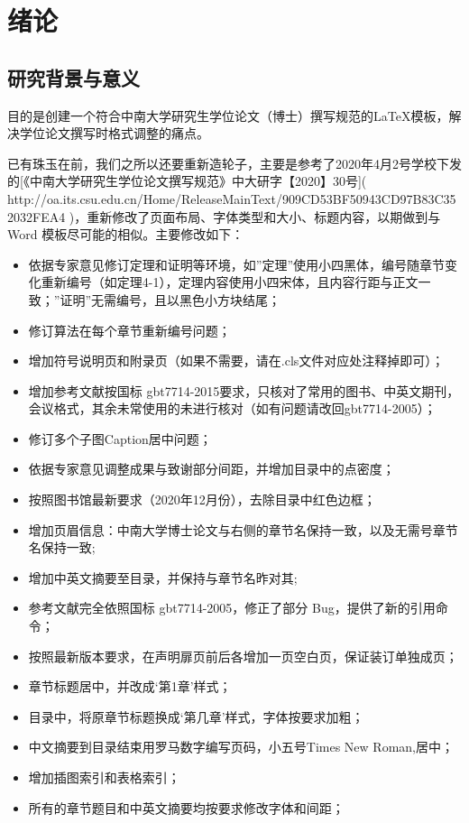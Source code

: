 \section{绪论}
\subsection{研究背景与意义}

目的是创建一个符合中南大学研究生学位论文（博士）撰写规范的LaTeX模板，解决学位论文撰写时格式调整的痛点。

已有珠玉在前，我们之所以还要重新造轮子，主要是参考了2020年4月2号学校下发的[《中南大学研究生学位论文撰写规范》中大研字【2020】30号]( http://oa.its.csu.edu.cn/Home/ReleaseMainText/909CD53BF50943CD97B83C352032FEA4 )，重新修改了页面布局、字体类型和大小、标题内容，以期做到与 Word 模板尽可能的相似。主要修改如下：
\begin{itemize}
\item 依据专家意见修订定理和证明等环境，如”定理”使用小四黑体，编号随章节变化重新编号（如定理4-1），定理内容使用小四宋体，且内容行距与正文一致；”证明”无需编号，且以黑色小方块结尾；
\item 修订算法在每个章节重新编号问题；
\item 增加符号说明页和附录页（如果不需要，请在.cls文件对应处注释掉即可）；
\item  增加参考文献按国标 gbt7714-2015要求，只核对了常用的图书、中英文期刊，会议格式，其余未常使用的未进行核对（如有问题请改回gbt7714-2005）；
\item  修订多个子图Caption居中问题；
\item 依据专家意见调整成果与致谢部分间距，并增加目录中的点密度；
\item 按照图书馆最新要求（2020年12月份），去除目录中红色边框；
\item 增加页眉信息：中南大学博士论文与右侧的章节名保持一致，以及无需号章节名保持一致;
\item 增加中英文摘要至目录，并保持与章节名昨对其;
\item 参考文献完全依照国标 gbt7714-2005，修正了部分 Bug，提供了新的引用命令；
\item 按照最新版本要求，在声明扉页前后各增加一页空白页，保证装订单独成页；
\item 章节标题居中，并改成‘第1章’样式；
\item 目录中，将原章节标题换成‘第几章’样式，字体按要求加粗；
\item 中文摘要到目录结束用罗马数字编写页码，小五号Times New Roman,居中；
\item 增加插图索引和表格索引；
\item 所有的章节题目和中英文摘要均按要求修改字体和间距；
\end{itemize}

